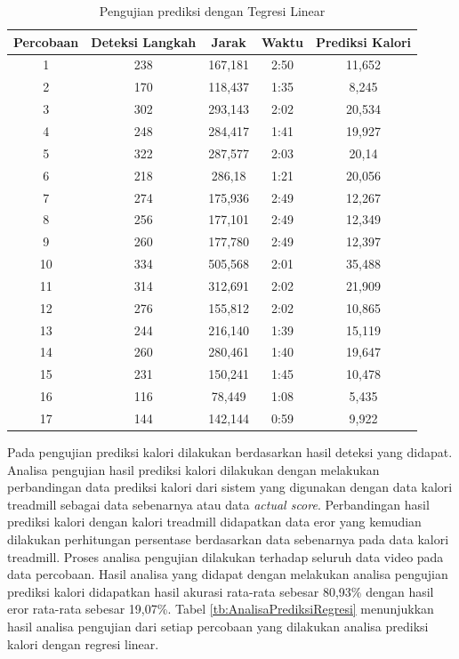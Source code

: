 \begin{longtable}{|c|c|c|c|c|}
  \caption{Pengujian prediksi dengan Tegresi Linear}
  \label{tb:PengujianPrediksiRegresi}                                   \\
  \hline
  \rowcolor[HTML]{C0C0C0}
  \textbf{Percobaan} & \textbf{Deteksi Langkah} & \textbf{Jarak} & \textbf{Waktu} & \textbf{Prediksi Kalori} \\
  \hline
  1   & 238   & 167,181    & 2:50    & 11,652  \\
  \hline
  2   & 170   & 118,437    & 1:35    & 8,245   \\
  \hline
  3   & 302   & 293,143    & 2:02    & 20,534  \\
  \hline
  4   & 248   & 284,417    & 1:41    & 19,927  \\
  \hline
  5   & 322   & 287,577    & 2:03    & 20,14   \\
  \hline
  6   & 218   & 286,18     & 1:21    & 20,056  \\
  \hline
  7   & 274   & 175,936    & 2:49    & 12,267  \\
  \hline
  8   & 256   & 177,101    & 2:49    & 12,349  \\
  \hline
  9   & 260   & 177,780    & 2:49    & 12,397  \\
  \hline
  10   & 334   & 505,568   & 2:01    & 35,488  \\
  \hline
  11   & 314   & 312,691   & 2:02    & 21,909  \\
  \hline
  12   & 276   & 155,812   & 2:02    & 10,865  \\
  \hline
  13   & 244   & 216,140   & 1:39    & 15,119  \\
  \hline
  14   & 260   & 280,461   & 1:40    & 19,647  \\
  \hline
  15   & 231   & 150,241   & 1:45    & 10,478  \\
  \hline
  16   & 116   & 78,449    & 1:08    & 5,435  \\
  \hline
  17   & 144   & 142,144   & 0:59    & 9,922  \\
  \hline
\end{longtable}

Pada pengujian prediksi kalori dilakukan berdasarkan hasil deteksi yang didapat. Analisa pengujian hasil prediksi kalori dilakukan dengan melakukan perbandingan data prediksi kalori dari sistem yang digunakan dengan data kalori treadmill sebagai data sebenarnya atau data \emph{actual score}. Perbandingan hasil prediksi kalori dengan kalori treadmill didapatkan data eror yang kemudian dilakukan perhitungan persentase berdasarkan data sebenarnya pada data kalori treadmill. Proses analisa pengujian dilakukan terhadap seluruh data video pada data percobaan. Hasil analisa yang didapat dengan melakukan analisa pengujian prediksi kalori didapatkan hasil akurasi rata-rata sebesar 80,93\% dengan hasil eror rata-rata sebesar 19,07\%. Tabel \ref{tb:AnalisaPrediksiRegresi} menunjukkan hasil analisa pengujian dari setiap percobaan yang dilakukan analisa prediksi kalori dengan regresi linear.


